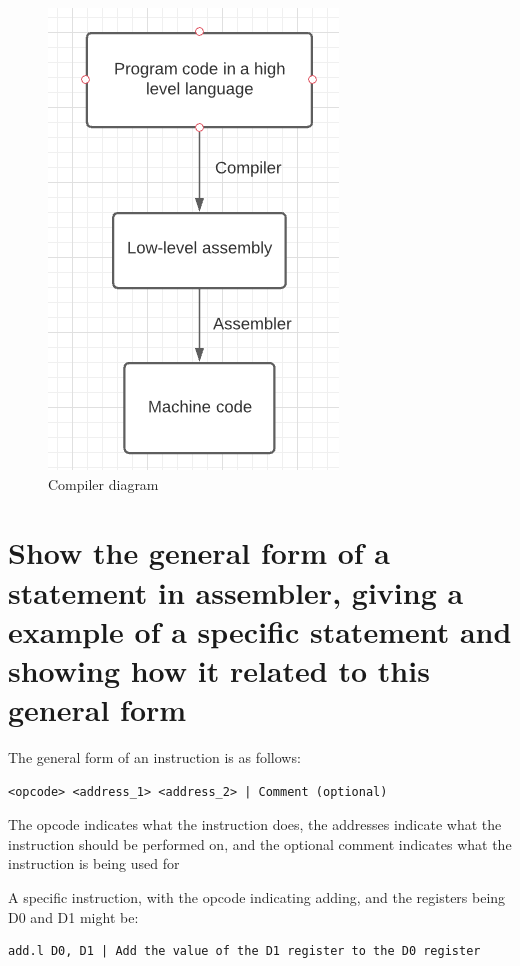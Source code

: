 \documentclass{article}
\begin{document}
\begin{figure}
\centering
\includegraphics{compilerDiagram.png}
\caption{Compiler diagram}
\end{figure}



\section{Show the general form of a statement in assembler, giving a example of
a specific statement and showing how it related to this general form}

The general form of an instruction is as follows:

\begin{verbatim}
<opcode> <address_1> <address_2> | Comment (optional) 
\end{verbatim}

The opcode indicates what the instruction does, the addresses indicate what the
instruction should be performed on, and the optional comment indicates what the
instruction is being used for

A specific instruction, with the opcode indicating adding, and the registers
being D0 and D1 might be:

\begin{verbatim}
add.l D0, D1 | Add the value of the D1 register to the D0 register
\end{verbatim}
\end{document}
